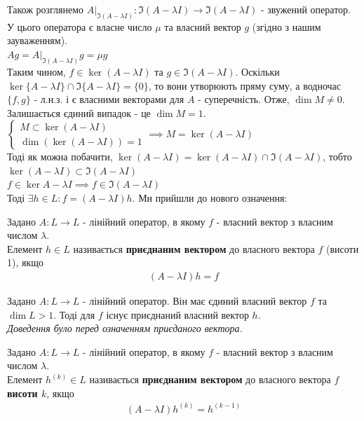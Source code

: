 Також розглянемо $A |_{\Im(A-\lambda I)}: \Im(A-\lambda I) \to \Im(A-\lambda I)$ - звужений оператор. У цього оператора є власне число $\mu$ та власний вектор $g$ (згідно з нашим зауваженням).\\
$Ag = A |_{\Im(A-\lambda I)} g = \mu g$\\
Таким чином, $f \in \ker(A-\lambda I)$ та $g \in \Im(A-\lambda I)$. Оскільки $\ker \{ A-\lambda I \} \cap \Im \{ A - \lambda I \} = \{ 0 \}$, то вони утворюють пряму суму, а водночас $\{f,g\}$ - л.н.з. і є власними векторами для $A$ - суперечність. Отже, $\dim M \neq 0$.
\bigskip \\
Залишається єдиний випадок - це $\dim M = 1$.\\
$\begin{cases}
M \subset \ker(A-\lambda I)\\
\dim{(\ker(A-\lambda I))} = 1
\end{cases}
\implies M = \ker(A-\lambda I)$
\bigskip \\
Тоді як можна побачити, $\ker(A-\lambda I) = \ker(A-\lambda I) \cap \Im (A - \lambda I)$, тобто $\ker(A-\lambda I) \subset \Im(A-\lambda I)$\\
$f \in \ker{A- \lambda I} \implies f \in \Im(A - \lambda I)$\\
Тоді $\exists h \in L: f = (A-\lambda I)h$. Ми прийшли до нового означення:

\begin{definition}
Задано $A: L \to L$ - лінійний оператор, в якому $f$ - власний вектор з власним числом $\lambda$.\\
Елемент $h \in L$ називається \textbf{приєднаним вектором} до власного вектора $f$ (висоти 1), якщо
\begin{align*}
(A-\lambda I)h = f
\end{align*}
\end{definition}

\begin{lemma}
Задано $A: L \to L$ - лінійний оператор. Він має єдиний власний вектор $f$ та $\dim L > 1$. Тоді для $f$ існує приєднаний власний вектор $h$.\\
\textit{Доведення було перед означенням приєданого вектора.}
\end{lemma}

\begin{definition}
Задано $A: L \to L$ - лінійний оператор, в якому $f$ - власний вектор з власним числом $\lambda$.\\
Елемент $h^{(k)} \in L$ називається \textbf{приєднаним вектором} до власного вектора $f$ \textbf{висоти $k$}, якщо
\begin{align*}
(A-\lambda I)h^{(k)} = h^{(k-1)}
\end{align*}
\end{definition}

